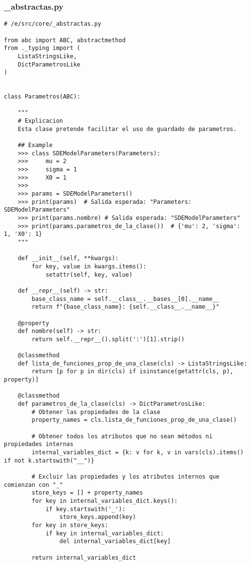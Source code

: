 \subsubsection{\_abstractas.py}
\begin{verbatim}
# /e/src/core/_abstractas.py

from abc import ABC, abstractmethod
from ._typing import (
    ListaStringsLike,
    DictParametrosLike
)


class Parametros(ABC):
    
    """
    # Explicacion
    Esta clase pretende facilitar el uso de guardado de parametros.
    
    ## Example
    >>> class SDEModelParameters(Parameters):
    >>>     mu = 2
    >>>     sigma = 1
    >>>     X0 = 1
    >>> 
    >>> params = SDEModelParameters()
    >>> print(params)  # Salida esperada: "Parameters: SDEModelParameters"
    >>> print(params.nombre) # Salida esperada: "SDEModelParameters"
    >>> print(params.parametros_de_la_clase())  # {'mu': 2, 'sigma': 1, 'X0': 1}
    """
    
    def __init__(self, **kwargs):
        for key, value in kwargs.items():
            setattr(self, key, value)

    def __repr__(self) -> str:
        base_class_name = self.__class__.__bases__[0].__name__
        return f"{base_class_name}: {self.__class__.__name__}"

    @property
    def nombre(self) -> str:
        return self.__repr__().split(':')[1].strip()

    @classmethod
    def lista_de_funciones_prop_de_una_clase(cls) -> ListaStringsLike:
        return [p for p in dir(cls) if isinstance(getattr(cls, p), property)]

    @classmethod
    def parametros_de_la_clase(cls) -> DictParametrosLike:
        # Obtener las propiedades de la clase
        property_names = cls.lista_de_funciones_prop_de_una_clase()
        
        # Obtener todos los atributos que no sean métodos ni propiedades internas
        internal_variables_dict = {k: v for k, v in vars(cls).items() if not k.startswith("__")}
        
        # Excluir las propiedades y los atributos internos que comienzan con "_"
        store_keys = [] + property_names
        for key in internal_variables_dict.keys():
            if key.startswith('_'): 
                store_keys.append(key)
        for key in store_keys:
            if key in internal_variables_dict:
                del internal_variables_dict[key]
        
        return internal_variables_dict
\end{verbatim}


